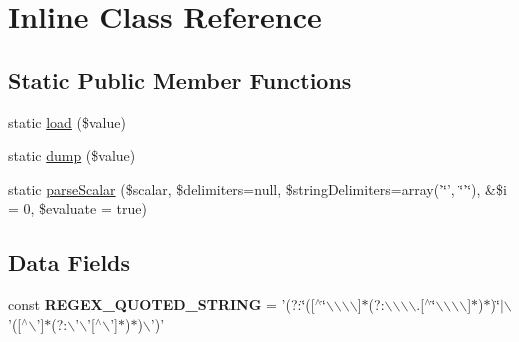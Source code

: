 \hypertarget{class_symfony_1_1_component_1_1_yaml_1_1_inline}{
\section{\-Inline \-Class \-Reference}
\label{class_symfony_1_1_component_1_1_yaml_1_1_inline}
}
\subsection*{\-Static \-Public \-Member \-Functions}
\begin{DoxyCompactItemize}
\item 
static \hyperlink{class_symfony_1_1_component_1_1_yaml_1_1_inline_a2b63bee7aa8c67d20c14ff9ba4de63a2}{load} (\$value)
\item 
static \hyperlink{class_symfony_1_1_component_1_1_yaml_1_1_inline_a8ef997303a6826dd4a87fff9c13b5d1d}{dump} (\$value)
\item 
static \hyperlink{class_symfony_1_1_component_1_1_yaml_1_1_inline_abf37f1e7c74d7a0ed52e64c25da8e454}{parse\-Scalar} (\$scalar, \$delimiters=null, \$string\-Delimiters=array('\char`\"{}', \char`\"{}'\char`\"{}), \&\$i = 0, \$evaluate = true) 
\end{DoxyCompactItemize}
\subsection*{\-Data \-Fields}
\begin{DoxyCompactItemize}
\item 
\hypertarget{class_symfony_1_1_component_1_1_yaml_1_1_inline_a87b5c4996630ab02b80f5abece2c2fe0}{
const {\bfseries \-R\-E\-G\-E\-X\-\_\-\-Q\-U\-O\-T\-E\-D\-\_\-\-S\-T\-R\-I\-N\-G} = '(?\-:\char`\"{}(\mbox{[}$^\wedge$\char`\"{}$\backslash$$\backslash$$\backslash$$\backslash$\mbox{]}$\ast$(?\-:$\backslash$$\backslash$$\backslash$$\backslash$.\mbox{[}$^\wedge$\char`\"{}$\backslash$$\backslash$$\backslash$$\backslash$\mbox{]}$\ast$)$\ast$)\char`\"{}$|$$\backslash$'(\mbox{[}$^\wedge$$\backslash$'\mbox{]}$\ast$(?\-:$\backslash$'$\backslash$'\mbox{[}$^\wedge$$\backslash$'\mbox{]}$\ast$)$\ast$)$\backslash$')'}
\label{class_symfony_1_1_component_1_1_yaml_1_1_inline_a87b5c4996630ab02b80f5abece2c2fe0}

\end{DoxyCompactItemize}
